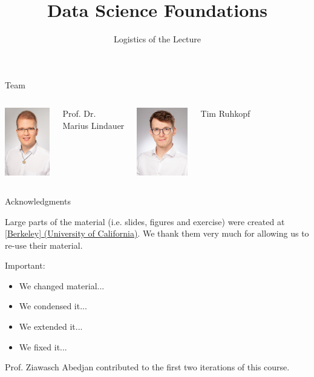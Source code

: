 \documentclass[aspectratio=169,handout]{../latex_main/tntbeamer}  %
\title[Introduction]{Data Science Foundations}
\subtitle{Logistics of the Lecture}
\begin{document}
	
	\maketitle

\begin{frame}[c]{Team}

\begin{columns}[T]




\centering
\includegraphics[height=8em]{./figures/Lindauer_Marius_004small.jpg}

Prof. Dr.\\ Marius Lindauer


\centering
\includegraphics[height=8em]{./figures/tim}

Tim Ruhkopf\\

\end{columns}

\end{frame}


\begin{frame}[c]{Acknowledgments}

Large parts of the material (i.e. slides, figures and exercise) were created at \href{https://ds100.org/}{[Berkeley] (University of California)}. We thank them very much for allowing us to re-use their material.

\bigskip

\alert{Important}:
\begin{itemize}
    \item We changed material...
    \item We condensed it...
    \item We extended it...
    \item We fixed it...
\end{itemize}

\vspace{1em}

Prof. Ziawasch Abedjan contributed to the first two iterations of this course.

\end{frame}
\end{document}
